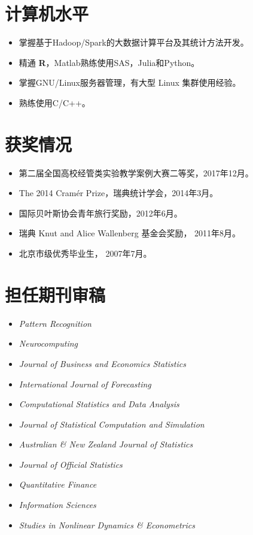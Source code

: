 \documentclass[twoside,a4paper,10pt]{amsart}
\begin{document}
\section*{计算机水平}
\begin{itemize}

\item 掌握基于Hadoop/Spark的大数据计算平台及其统计方法开发。

\item  精通 \textbf{R}，Matlab熟练使用SAS，Julia和Python。

\item  掌握GNU/Linux服务器管理，有大型 Linux 集群使用经验。

\item  熟练使用C/C++。
\end{itemize}

\section*{获奖情况}
\begin{itemize}

\item 第二届全国高校经管类实验教学案例大赛二等奖，2017年12月。
\item The 2014 Cramér Prize，瑞典统计学会，2014年3月。

\item 国际贝叶斯协会青年旅行奖励，2012年6月。

\item 瑞典 Knut and Alice Wallenberg 基金会奖励， 2011年8月。

\item 北京市级优秀毕业生， 2007年7月。
\end{itemize}

\section*{担任期刊审稿}
\begin{itemize}
\item \emph{Pattern Recognition}
\item \emph{Neurocomputing}
\item  \emph{Journal of Business and Economics Statistics}
\item  \emph{International Journal of Forecasting}
\item  \emph{Computational Statistics and Data Analysis}
\item  \emph{Journal of Statistical Computation and Simulation}
\item  \emph{Australian \& New Zealand Journal of Statistics}
\item  \emph{Journal of Official Statistics}
\item  \emph{Quantitative Finance}
\item  \emph{Information Sciences}
\item  \emph{Studies in Nonlinear Dynamics \& Econometrics}
\end{itemize}
\end{document}
